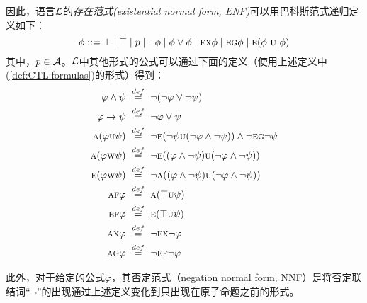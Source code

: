因此，语言$\cal L$的\emph{存在范式(existential normal form, ENF)}可以用巴科斯范式递归定义如下：
\begin{equation}\label{def:CTL:formulas}
	\phi ::=  \bot \mid \top \mid p \mid\neg\phi \mid \phi\lor\phi \mid
	\textsc{e} \textsc{x} \phi \mid
	\textsc{e} \textsc{g} \phi \mid
	\textsc{e} (\phi\ \textsc{u}\ \phi)
\end{equation}
其中，$p\in {\cal A}$。$\cal L$中其他形式的公式可以通过下面的定义（使用上述定义中(\ref{def:CTL:formulas})的形式）得到：
\begin{alignat}{2}
	 \varphi \wedge \psi& \ \overset{def}{=}\ \neg (\neg \varphi \vee \neg \psi)\\
	 \varphi \rto \psi& \ \overset{def}{=}\ \neg \varphi \vee \psi\\
	 \ALL(\varphi \UNTILL \psi)& \ \overset{def}{=}\ \neg\EXIST(\neg \psi \UNTILL(\neg \varphi \wedge \neg \psi)) \wedge \neg \EXIST \GLOBAL \neg \psi\\
	 \ALL(\varphi \UNLESS \psi)& \ \overset{def}{=}\  \neg\EXIST((\varphi \wedge \neg \psi) \UNTILL (\neg \varphi \wedge \neg \psi))\\
	 \EXIST(\varphi \UNLESS \psi)& \ \overset{def}{=}\  \neg\ALL((\varphi \wedge \neg \psi) \UNTILL (\neg \varphi \wedge \neg \psi))\\
	 \ALL\FUTURE \varphi& \ \overset{def}{=}\ 	\ALL(\top \UNTILL \psi)\\
	 \EXIST\FUTURE \varphi& \ \overset{def}{=}\ \EXIST(\top \UNTILL \psi)\\
	 \ALL \NEXT \varphi& \ \overset{def}{=}\  \neg \EXIST \NEXT \neg \varphi\\
	 \ALL \GLOBAL \varphi& \ \overset{def}{=}\  \neg \EXIST \FUTURE \neg \varphi
\end{alignat}

此外，对于给定的公式$\varphi$，其否定范式（negation normal form, NNF）是将否定联结词“$\neg$”的出现通过上述定义变化到只出现在原子命题之前的形式。

